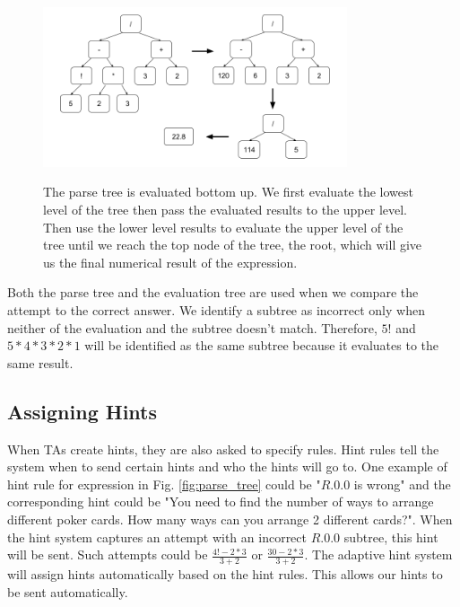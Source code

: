 \documentclass{llncs}
\begin{document}
\begin{figure}[ht]
   \centering
   \caption{The parse tree is evaluated bottom up. We first evaluate the lowest level of the tree then pass the evaluated results to the upper level. Then use the lower level results to evaluate the upper level of the tree until we reach the top node of the tree, the root, which will give us the final numerical result of the expression.}
   \includegraphics[width=0.8\textwidth]{image/Eval_Trees.png}
   \label{fig:eval_tree}
\end{figure}

Both the parse tree and the evaluation tree are used when we compare the attempt to the correct answer. We identify a subtree as incorrect only when neither of the evaluation and the subtree doesn't match. Therefore, $5!$ and $5*4*3*2*1$ will be identified as the same subtree because it evaluates to the same result.


\subsection*{Assigning Hints}
When TAs create hints, they are also asked to specify rules. Hint rules tell the system when to send certain hints and who the hints will go to. One example of hint rule for expression in Fig. \ref{fig:parse_tree} could be "$R.0.0$ is wrong" and the corresponding hint could be "You need to find the number of ways to arrange different poker cards. How many ways can you arrange 2 different cards?". When the hint system captures an attempt with an incorrect $R.0.0$ subtree, this hint will be sent. Such attempts could be $\frac{4!-2*3}{3+2}$ or $\frac{30-2*3}{3+2}$. The adaptive hint system will assign hints automatically based on the hint rules. This allows our hints to be sent automatically.
\end{document}
